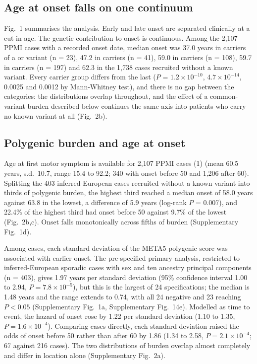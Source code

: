 \documentclass[10pt]{article}
\begin{document}
\subsection*{Age at onset falls on one continuum}

Fig.~1 summarises the analysis. Early and late onset are separated clinically at a cut in age. The genetic contribution to onset is continuous. Among the 2,107 PPMI cases with a
recorded onset date, median onset was 37.0 years in carriers of a  or 
variant (n = 23), 47.2 in  carriers (n = 41), 59.0 in  carriers (n = 108),
59.7 in  carriers (n = 197) and 62.3 in the 1,738 cases recruited without a known
variant. Every carrier group differs from the last ($P$ = $1.2\times10^{-10}$, $4.7\times10^{-14}$, 0.0025 and
0.0012 by Mann-Whitney test), and there is no gap between the categories: the distributions overlap
throughout, and the effect of a common-variant burden described below continues the same axis into
patients who carry no known variant at all (Fig.~2b).

\subsection*{Polygenic burden and age at onset}

Age at first motor symptom is available for 2,107 PPMI cases (1) (mean 60.5 years, s.d.\ 10.7,
range 15.4 to 92.2; 340 with onset before 50 and 1,206 after 60). Splitting the 403
inferred-European cases recruited without a known variant into thirds of polygenic burden, the
highest third reached a median onset of 58.0 years against 63.8 in the lowest, a difference of 5.9
years (log-rank $P$ = 0.007), and 22.4\% of the highest third had onset before 50 against 9.7\% of
the lowest (Fig.~2b,c). Onset falls monotonically across fifths of burden (Supplementary Fig.~1d).

Among cases, each standard deviation of the META5 polygenic score was associated with earlier
onset. The pre-specified primary analysis, restricted to inferred-European sporadic cases with sex
and ten ancestry principal components (n = 403), gives 1.97 years per standard deviation (95\%
confidence interval 1.00 to 2.94, $P = 7.8\times10^{-5}$), but this is the largest of 24
specifications; the median is 1.48 years and the range extends to 0.74, with all 24 negative and
23 reaching $P < 0.05$ (Supplementary Fig.~1a, Supplementary Fig.~14e). Modelled as time to event, the hazard of
onset rose by 1.22 per standard deviation (1.10 to 1.35, $P = 1.6\times10^{-4}$). Comparing cases
directly, each standard deviation raised the odds of onset before 50 rather than after 60 by 1.86
(1.34 to 2.58, $P = 2.1\times10^{-4}$; 67 against 216 cases). The two distributions of burden
overlap almost completely and differ in location alone (Supplementary Fig.~2a).
\end{document}
